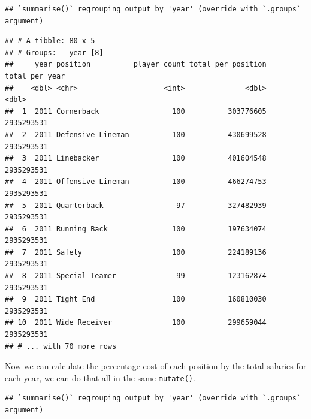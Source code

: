 \documentclass[
]{book}
\newenvironment{Shaded}{\begin{snugshade}}{\end{snugshade}}
\newcommand{\DataTypeTok}[1]{\textcolor[rgb]{0.13,0.29,0.53}{#1}}
\newcommand{\KeywordTok}[1]{\textcolor[rgb]{0.13,0.29,0.53}{\textbf{#1}}}
\newcommand{\NormalTok}[1]{#1}
\newcommand{\OperatorTok}[1]{\textcolor[rgb]{0.81,0.36,0.00}{\textbf{#1}}}
\newcommand{\StringTok}[1]{\textcolor[rgb]{0.31,0.60,0.02}{#1}}
\begin{document}
\begin{verbatim}
## `summarise()` regrouping output by 'year' (override with `.groups` argument)
\end{verbatim}

\begin{verbatim}
## # A tibble: 80 x 5
## # Groups:   year [8]
##     year position          player_count total_per_position total_per_year
##    <dbl> <chr>                    <int>              <dbl>          <dbl>
##  1  2011 Cornerback                 100          303776605     2935293531
##  2  2011 Defensive Lineman          100          430699528     2935293531
##  3  2011 Linebacker                 100          401604548     2935293531
##  4  2011 Offensive Lineman          100          466274753     2935293531
##  5  2011 Quarterback                 97          327482939     2935293531
##  6  2011 Running Back               100          197634074     2935293531
##  7  2011 Safety                     100          224189136     2935293531
##  8  2011 Special Teamer              99          123162874     2935293531
##  9  2011 Tight End                  100          160810030     2935293531
## 10  2011 Wide Receiver              100          299659044     2935293531
## # ... with 70 more rows
\end{verbatim}

Now we can calculate the percentage cost of each position by the total salaries for each year, we can do that all in the same \texttt{mutate()}.

\begin{Shaded}
\end{Shaded}

\begin{verbatim}
## `summarise()` regrouping output by 'year' (override with `.groups` argument)
\end{verbatim}
\end{document}
